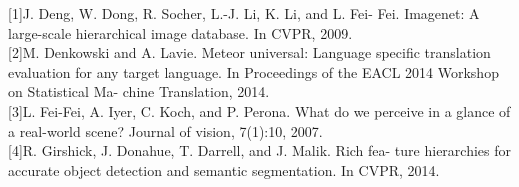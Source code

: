 \documentclass[12pt]{article}%
\begin{document}
[1]J. Deng, W. Dong, R. Socher, L.-J. Li,  K. Li,  and L. Fei- Fei. Imagenet: A large-scale hierarchical image database. In CVPR, 2009.\\

[2]M. Denkowski and A. Lavie. Meteor universal: Language specific translation evaluation for any target language. In Proceedings of the EACL 2014 Workshop on Statistical Ma- chine Translation, 2014.\\

%
%
%
%
%

[3]L. Fei-Fei, A. Iyer, C. Koch, and P. Perona. What do we perceive in a glance of a real-world scene? Journal of vision, 7(1):10, 2007.\\

%

[4]R. Girshick, J. Donahue, T. Darrell, and J. Malik. Rich fea- ture hierarchies for accurate object detection and semantic segmentation. In CVPR, 2014.\\
\end{document}
